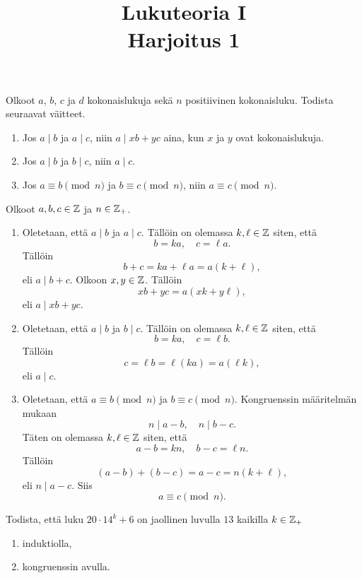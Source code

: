 \documentclass[11pt,a4paper]{amsart}
\title{Lukuteoria I\\Harjoitus 1}
\author{}
\date{}
\begin{document}

\begin{exercise}
  Olkoot \(a\), \(b\), \(c\) ja \(d\) kokonaislukuja sekä \(n\)
  positiivinen kokonaisluku. Todista seuraavat väitteet.
  \begin{enumerate}[label=(\alph*), nosep]
    \item Jos \(a \mid b\) ja \(a \mid c\), niin \(a \mid xb + yc\)
      aina, kun \(x\) ja \(y\) ovat kokonaislukuja.
    \item Jos \(a \mid b\) ja \(b \mid c\), niin \(a \mid c\).
    \item Jos \(a \equiv b \pmod{n}\) ja \(b \equiv c \pmod{n}\),
      niin \(a \equiv c \pmod{n}\).
  \end{enumerate}
\end{exercise}

\begin{solution}
  Olkoot \(a, b, c \in \mathbb{Z}\) ja \(n \in \mathbb{Z}_+\).
  \begin{enumerate}[label=(\alph*), nosep]
    \item Oletetaan, että \(a \mid b\) ja \(a \mid c\). Tällöin on olemassa
      \(k, \ell \in \mathbb{Z}\) siten, että
      \[
        b = ka, \quad c = \ell a.
      \]
      Tällöin
      \[
        b + c = ka + \ell a = a(k + \ell),
      \]
      eli \(a \mid b + c\). Olkoon \(x, y \in \mathbb{Z}\). Tällöin
      \[
        xb + yc = a(xk + y\ell),
      \]
      eli \(a \mid xb + yc\).
    \item Oletetaan, että \(a \mid b\) ja \(b \mid c\). Tällöin on olemassa
      \(k, \ell \in \mathbb{Z}\) siten, että
      \[
        b = ka, \quad c = \ell b.
      \]
      Tällöin
      \[
        c = \ell b = \ell(ka) = a(\ell k),
      \]
      eli \(a \mid c\).
    \item Oletetaan, että \(a \equiv b \pmod{n}\) ja \(b \equiv c \pmod{n}\).
      Kongruenssin määritelmän mukaan
      \[
        n \mid a - b, \quad n \mid b - c.
      \]
      Täten on olemassa \(k, \ell \in \mathbb{Z}\) siten, että
      \[
        a - b = kn, \quad b - c = \ell n.
      \]
      Tällöin
      \[
        (a - b) + (b - c) = a - c = n(k + \ell),
      \]
      eli \(n \mid a - c\). Siis
      \[
        a \equiv c \pmod{n}.
      \]
  \end{enumerate}
\end{solution}

\begin{exercise}
  Todista, että luku \(20 \cdot 14^k + 6\) on jaollinen luvulla \(13\)
  kaikilla \(k \in \mathbb{Z}_+\)
  \begin{enumerate}[label=(\alph*), nosep]
    \item induktiolla,
    \item kongruenssin avulla.
  \end{enumerate}
\end{exercise}
\end{document}
